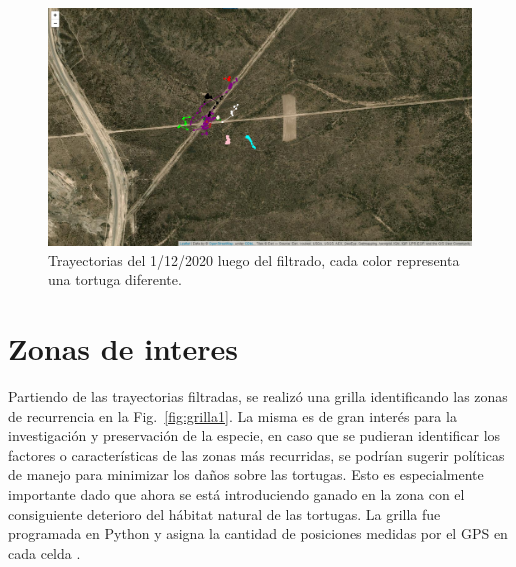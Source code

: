 \begin{figure}[ht]
    \begin{center}
       
   
    \includegraphics[width=\imsize]{Chap2/Traye1_12_conF.png}
\end{center}
    \caption[Trayectorias un dia de medición, despues del filtrado.]{Trayectorias del 1/12/2020 luego del filtrado, cada color representa una tortuga diferente.}
    \label{fig:trayeConFiltr}
\end{figure}

\section{Zonas de interes}
Partiendo de las trayectorias filtradas, se realizó  una grilla identificando las zonas de recurrencia en la Fig.~\ref{fig:grilla1}. La misma es de gran interés para la investigación y preservación de la especie, en caso que se pudieran identificar los factores o características de las zonas más recurridas, se podrían sugerir políticas de manejo para minimizar los daños sobre las tortugas. Esto es especialmente importante dado que ahora se está introduciendo ganado en la zona con el consiguiente deterioro del hábitat natural de las tortugas. La grilla fue programada en Python y asigna la cantidad de posiciones medidas por el GPS en cada celda \cite{github}.
 
